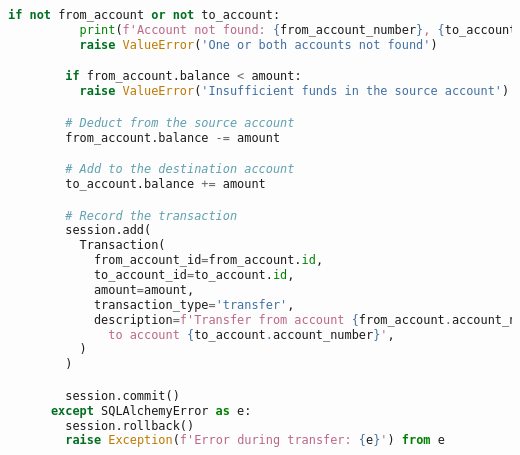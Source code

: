\begin{lstlisting}[language=Python]
        if not from_account or not to_account:
          print(f'Account not found: {from_account_number}, {to_account_number}')
          raise ValueError('One or both accounts not found')

        if from_account.balance < amount:
          raise ValueError('Insufficient funds in the source account')

        # Deduct from the source account
        from_account.balance -= amount

        # Add to the destination account
        to_account.balance += amount

        # Record the transaction
        session.add(
          Transaction(
            from_account_id=from_account.id,
            to_account_id=to_account.id,
            amount=amount,
            transaction_type='transfer',
            description=f'Transfer from account {from_account.account_number} \
              to account {to_account.account_number}',
          )
        )

        session.commit()
      except SQLAlchemyError as e:
        session.rollback()
        raise Exception(f'Error during transfer: {e}') from e
\end{lstlisting}

